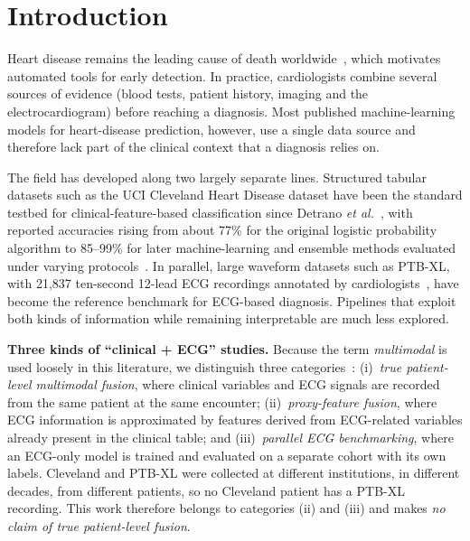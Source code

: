 \section{Introduction}
Heart disease remains the leading cause of death worldwide~\cite{who2023}, which motivates automated tools for early detection. In practice, cardiologists combine several sources of evidence (blood tests, patient history, imaging and the electrocardiogram) before reaching a diagnosis. Most published machine-learning models for heart-disease prediction, however, use a single data source and therefore lack part of the clinical context that a diagnosis relies on.

The field has developed along two largely separate lines. Structured tabular datasets such as the UCI Cleveland Heart Disease dataset have been the standard testbed for clinical-feature-based classification since Detrano \emph{et al.}~\cite{detrano1989}, with reported accuracies rising from about 77\% for the original logistic probability algorithm to 85--99\% for later machine-learning and ensemble methods evaluated under varying protocols~\cite{haq2018,mohan2019,latha2019,gao2021}. In parallel, large waveform datasets such as PTB-XL, with 21{,}837 ten-second 12-lead ECG recordings annotated by cardiologists~\cite{wagner2020}, have become the reference benchmark for ECG-based diagnosis. Pipelines that exploit both kinds of information while remaining interpretable are much less explored.

\textbf{Three kinds of ``clinical + ECG'' studies.} Because the term \emph{multimodal} is used loosely in this literature, we distinguish three categories~\cite{huang2020fusion}:
(i)~\emph{true patient-level multimodal fusion}, where clinical variables and ECG signals are recorded from the same patient at the same encounter;
(ii)~\emph{proxy-feature fusion}, where ECG information is approximated by features derived from ECG-related variables already present in the clinical table; and
(iii)~\emph{parallel ECG benchmarking}, where an ECG-only model is trained and evaluated on a separate cohort with its own labels.
Cleveland and PTB-XL were collected at different institutions, in different decades, from different patients, so no Cleveland patient has a PTB-XL recording. This work therefore belongs to categories (ii) and (iii) and makes \emph{no claim of true patient-level fusion}.

